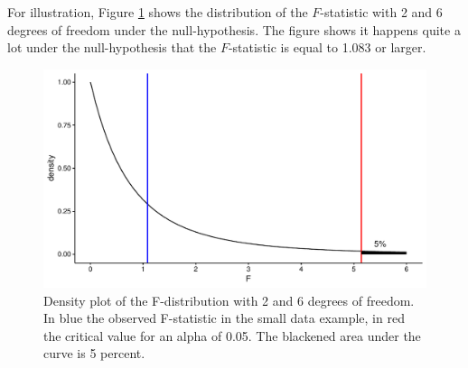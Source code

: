 \documentclass[]{book}\usepackage[]{graphicx}\usepackage[]{color}
\makeatletter
\def\maxwidth{ %
  \ifdim\Gin@nat@width>\linewidth
    \linewidth
  \else
    \Gin@nat@width
  \fi
}
\newenvironment{knitrout}{}{} %
\makeatother
\begin{document}
For illustration, Figure \ref{fig:F2_6} shows the distribution of the $F$-statistic with 2 and 6 degrees of freedom under the null-hypothesis. The figure shows it happens quite a lot under the null-hypothesis that the $F$-statistic is equal to 1.083 or larger. 


\begin{knitrout}
\color{fgcolor}\begin{figure}

{\centering \includegraphics[width=\maxwidth]{figure/F2_6-1} 

}

\caption[Density plot of the F-distribution with 2 and 6 degrees of freedom]{Density plot of the F-distribution with 2 and 6 degrees of freedom. In blue the observed F-statistic in the small data example, in red the critical value for an alpha of 0.05. The blackened area under the curve is 5 percent.}\label{fig:F2_6}
\end{figure}


\end{knitrout}
\end{document}
